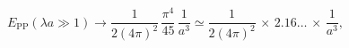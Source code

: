 \begin{equation}
E_{\text{PP}}(\lambda a \gg 1) \to \frac{1}{2 (4\pi)^2 }\,
\frac{\pi^4}{45}\, \frac{1}{a^3}\simeq \frac{1}{2 (4\pi)^2 }\, \times
\,2.16\dots\,\times\, \frac{1}{a^3},
\label{CasClas}
\end{equation}

